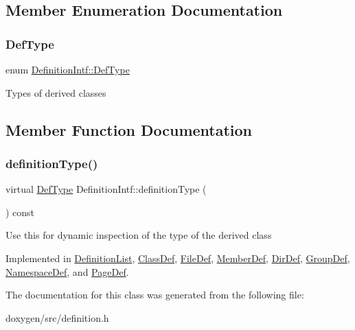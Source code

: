 \subsection{Member Enumeration Documentation}
\mbox{\label{class_definition_intf_ada60114bc621669dd8c19edfc6421766}} 
\subsubsection{\texorpdfstring{DefType}{DefType}}
{\footnotesize\ttfamily enum \mbox{\hyperlink{class_definition_intf_ada60114bc621669dd8c19edfc6421766}{Definition\+Intf\+::\+Def\+Type}}}

Types of derived classes 

\subsection{Member Function Documentation}
\mbox{\label{class_definition_intf_ac8ee00bc1af5558ae37f6896d16f5a3a}} 
\subsubsection{\texorpdfstring{definitionType()}{definitionType()}}
{\footnotesize\ttfamily virtual \mbox{\hyperlink{class_definition_intf_ada60114bc621669dd8c19edfc6421766}{Def\+Type}} Definition\+Intf\+::definition\+Type (\begin{DoxyParamCaption}{ }\end{DoxyParamCaption}) const\hspace{0.3cm}{\ttfamily [pure virtual]}}

Use this for dynamic inspection of the type of the derived class 

Implemented in \mbox{\hyperlink{class_definition_list_aef3047a40f8e9519e609019db6cb13b9}{Definition\+List}}, \mbox{\hyperlink{class_class_def_ab84f56a99816a73920785d48a059c769}{Class\+Def}}, \mbox{\hyperlink{class_file_def_a91629ee75b5caf817a7338c02a12bd0a}{File\+Def}}, \mbox{\hyperlink{class_member_def_a0c16b4d5effd11dbf337ece47b0d7463}{Member\+Def}}, \mbox{\hyperlink{class_dir_def_abd7bc6eb8fd85af099e2d0cb7ad322db}{Dir\+Def}}, \mbox{\hyperlink{class_group_def_a1b6b622a9adaeb6b2845945ccb1ddd93}{Group\+Def}}, \mbox{\hyperlink{class_namespace_def_a1d3f855eb7cac3c7b13a00d78037823b}{Namespace\+Def}}, and \mbox{\hyperlink{class_page_def_a4485734f9ef865738e090ff6b122410f}{Page\+Def}}.



The documentation for this class was generated from the following file\+:\begin{DoxyCompactItemize}
\item 
doxygen/src/definition.\+h\end{DoxyCompactItemize}
